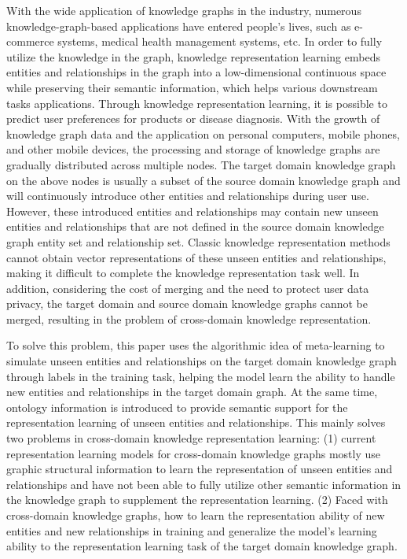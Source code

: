 With the wide application of knowledge graphs in the industry, numerous knowledge-graph-based applications have entered people's lives, such as e-commerce systems, medical health management systems, etc. In order to fully utilize the knowledge in the graph, knowledge representation learning embeds entities and relationships in the graph into a low-dimensional continuous space while preserving their semantic information, which helps various downstream tasks applications. Through knowledge representation learning, it is possible to predict user preferences for products or disease diagnosis. With the growth of knowledge graph data and the application on personal computers, mobile phones, and other mobile devices, the processing and storage of knowledge graphs are gradually distributed across multiple nodes. The target domain knowledge graph on the above nodes is usually a subset of the source domain knowledge graph and will continuously introduce other entities and relationships during user use. However, these introduced entities and relationships may contain new unseen entities and relationships that are not defined in the source domain knowledge graph entity set and relationship set. Classic knowledge representation methods cannot obtain vector representations of these unseen entities and relationships, making it difficult to complete the knowledge representation task well. In addition, considering the cost of merging and the need to protect user data privacy, the target domain and source domain knowledge graphs cannot be merged, resulting in the problem of cross-domain knowledge representation.

To solve this problem, this paper uses the algorithmic idea of meta-learning to simulate unseen entities and relationships on the target domain knowledge graph through labels in the training task, helping the model learn the ability to handle new entities and relationships in the target domain graph. At the same time, ontology information is introduced to provide semantic support for the representation learning of unseen entities and relationships. This mainly solves two problems in cross-domain knowledge representation learning: (1) current representation learning models for cross-domain knowledge graphs mostly use graphic structural information to learn the representation of unseen entities and relationships and have not been able to fully utilize other semantic information in the knowledge graph to supplement the representation learning. (2) Faced with cross-domain knowledge graphs, how to learn the representation ability of new entities and new relationships in training and generalize the model's learning ability to the representation learning task of the target domain knowledge graph.

